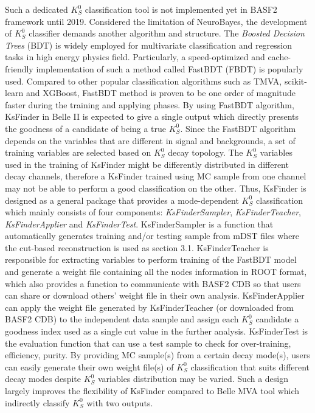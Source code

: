 Such a dedicated $K_S^0$ classification tool is not implemented yet in BASF2 framework until 2019. Considered the limitation of NeuroBayes, the development of $K_S^0$ classifier demands another algorithm and structure. The \textit{Boosted Decision Trees} (BDT) is widely employed for multivariate classification and regression tasks in high energy physics field. Particularly, a speed-optimized and cache-friendly
implementation of such a method called FastBDT (FBDT) is popularly used\cite{keck2016fastbdt}. Compared to other popular classification algorithms such as TMVA\cite{therhaag2012tmva}, scikit-learn\cite{pedregosa2011scikit} and XGBoost\cite{chen2016xgboost}, FastBDT method is proven to be one order of magnitude faster during the training and applying phases\cite{keck2016fastbdt}. 
By using FastBDT algorithm, KsFinder in Belle II is expected to give a single output which directly presents the goodness of a candidate of being a true $K_S^0$. Since the FastBDT algorithm depends on the variables that are different in signal and backgrounds, a set of training variables are selected based on $K_S^0$ decay topology.  The $K_S^0$ variables used in the training of KsFinder might be differently distributed in different decay channels, therefore a KsFinder trained using MC sample from one channel may not be able to perform a good classification on the other. Thus, KsFinder is designed as a general package that provides a mode-dependent $K_S^0$ classification which mainly consists of four components: \textit{KsFinderSampler}, \textit{KsFinderTeacher}, \textit{KsFinderApplier} and \textit{KsFinderTest}. KsFinderSampler is a function that automatically generates training and/or testing sample from mDST files where the cut-based reconstruction is used as section 3.1. KsFinderTeacher is responsible for extracting variables to perform training of the FastBDT model and generate a weight file containing all the nodes information in ROOT format, which also provides a function to communicate with BASF2 CDB so that users can share or download others' weight file in their own analysis. KsFinderApplier can apply the weight file generated by KsFinderTeacher (or downloaded from BASF2 CDB) to the independent data sample and assign each $K_S^0$ candidate a goodness index used as a single cut value in the further analysis. KsFinderTest is the evaluation function that can use a test sample to check for over-training, efficiency, purity.  By providing MC sample(s) from a certain decay mode(s), users can easily generate their own weight file(s) of $K_S^0$ classification that suits different decay modes despite $K_S^0$ variables distribution may be varied. Such a design largely improves the flexibility of KsFinder compared to Belle MVA tool which indirectly classify $K_S^0$ with two outputs. 

